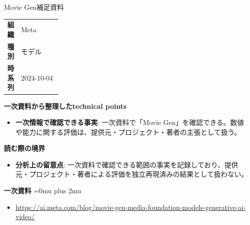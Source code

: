 \begin{technicalnote}{Movie Gen}{補足資料}
\begingroup
\begin{tabularx}{\linewidth}{@{}>{\bfseries}p{0.22\linewidth}X@{}}
組織 & Meta \\
種別 & モデル \\
時系列 & 2024-10-04 \\
\end{tabularx}
\smallskip
{\bfseries 一次資料から整理したtechnical points}
\begin{itemize}[leftmargin=1.5em,itemsep=0.35em]
\item \textbf{一次情報で確認できる事実}: 一次資料で「Movie Gen」を確認できる。数値や能力に関する評価は、提供元・プロジェクト・著者の主張として扱う。
\end{itemize}
\begin{minipage}{\linewidth}
{\bfseries 読む際の境界}
\begin{itemize}[leftmargin=1.5em,itemsep=0.35em]
\item \textbf{分析上の留意点}: 一次資料で確認できる範囲の事実を記録しており、提供元・プロジェクト・著者による評価を独立再現済みの結果として扱わない。
\end{itemize}
\begin{samepage}
{\bfseries 一次資料}
\begingroup\sloppy
\Urlmuskip=0mu plus 2mu\relax
\begin{itemize}[leftmargin=1.5em,itemsep=0.25em]
\item {\scriptsize\url{https://ai.meta.com/blog/movie-gen-media-foundation-models-generative-ai-video/}}
\end{itemize}
\endgroup
\end{samepage}
\end{minipage}
\endgroup
\end{technicalnote}
\medskip

